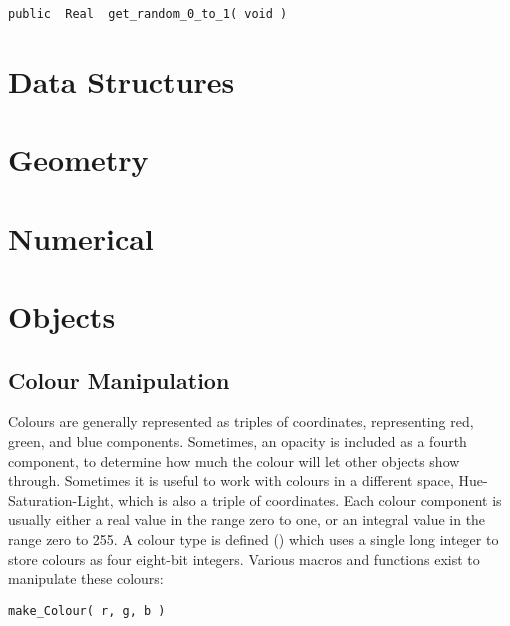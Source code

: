 
{\bf\begin{verbatim}
public  Real  get_random_0_to_1( void )
\end{verbatim}}


\chapter{Data Structures}

\chapter{Geometry}

\chapter{Numerical}

\chapter{Objects}

\section{Colour Manipulation}

Colours are generally represented as triples of coordinates,
representing red, green, and blue components.  Sometimes, an opacity
is included as a fourth component, to determine how much the colour
will let other objects show through.  Sometimes it is useful
to work with colours in a different space, Hue-Saturation-Light, which
is also a triple of coordinates.  Each colour component is usually either a
real value in the range zero to one, or an integral value in the range
zero to 255.  A colour type is defined () which uses a
single long integer to store colours as four eight-bit integers.
Various macros and functions exist to manipulate these colours:

{\bf\begin{verbatim}
make_Colour( r, g, b )
\end{verbatim}}


